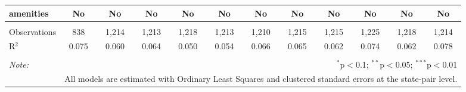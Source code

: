 \begin{table}[!htbp]
\begin{tabular}{@{\extracolsep{5pt}}lccccccccccc}
amenities & No & No & No & No & No & No & No & No & No & No & No \\ 
\hline \\[-1.8ex] 
Observations & 838 & 1,214 & 1,213 & 1,218 & 1,213 & 1,210 & 1,215 & 1,215 & 1,225 & 1,218 & 1,214 \\ 
R$^{2}$ & 0.075 & 0.060 & 0.064 & 0.050 & 0.054 & 0.066 & 0.065 & 0.062 & 0.074 & 0.062 & 0.078 \\ 
\hline 
\hline \\[-1.8ex] 
\textit{Note:}  & \multicolumn{11}{r}{$^{*}$p$<$0.1; $^{**}$p$<$0.05; $^{***}$p$<$0.01} \\ 
 & \multicolumn{11}{r}{All models are estimated with Ordinary Least Squares and clustered standard errors at the state-pair level.} \\ 
\end{tabular} 
\end{table} 
